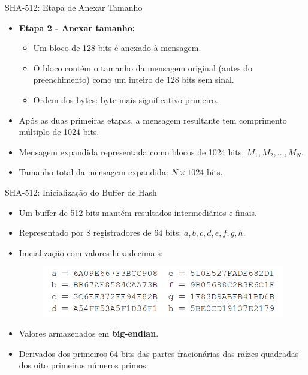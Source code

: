 \begin{frame}{SHA-512: Etapa de Anexar Tamanho}
    \begin{itemize}
        \item \textbf{Etapa 2 - Anexar tamanho:}
        \begin{itemize}
            \item Um bloco de 128 bits é anexado à mensagem.
            \item O bloco contém o tamanho da mensagem original (antes do preenchimento) como um inteiro de 128 bits sem sinal.
            \item Ordem dos bytes: byte mais significativo primeiro.
        \end{itemize}
        \item Após as duas primeiras etapas, a mensagem resultante tem comprimento múltiplo de 1024 bits.
        \item Mensagem expandida representada como blocos de 1024 bits: $M_1, M_2, \dots, M_N$.
        \item Tamanho total da mensagem expandida: $N \times 1024$ bits.
    \end{itemize}
\end{frame}

\begin{frame}{SHA-512: Inicialização do Buffer de Hash}
    \begin{itemize}
        \item Um buffer de 512 bits mantém resultados intermediários e finais.
        \item Representado por 8 registradores de 64 bits: $a, b, c, d, e, f, g, h$.
        \item Inicialização com valores hexadecimais:
\begin{figure}
    \centering
    \includegraphics[width=\linewidth]{Figuras/buffer-hash-sha256.png}

\end{figure}
        \item Valores armazenados em \textbf{big-endian}.
        \item Derivados dos primeiros 64 bits das partes fracionárias das raízes quadradas dos oito primeiros números primos.
    \end{itemize}
\end{frame}
